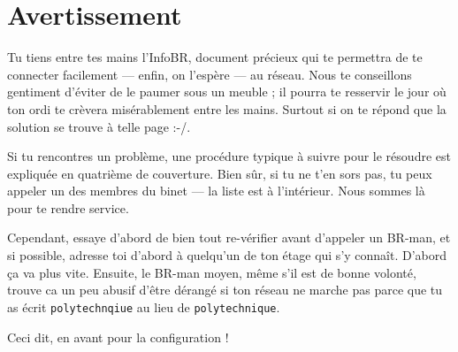\thispagestyle{empty}


\section*{Avertissement}

Tu tiens entre tes mains l'InfoBR, document pr\'ecieux qui te permettra de te connecter facilement
--- enfin, on l'esp\`ere --- au r\'eseau.
Nous te conseillons gentiment d'\'eviter de le paumer sous un meuble ; il pourra te resservir le jour o\`u ton ordi te cr\`evera mis\'erablement entre les
mains. Surtout si on te r\'epond que la solution se trouve \`a telle page :-/.

Si tu rencontres un probl\`eme, une proc\'edure typique \`a suivre pour le r\'esoudre est expliqu\'ee en quatri\`eme de couverture.
Bien sûr, si tu ne t'en sors pas, tu peux appeler un des membres du binet --- la liste est \`a l'int\'erieur.
Nous sommes l\`a pour te rendre service.

Cependant, essaye d'abord de bien tout re-v\'erifier avant d'appeler un BR-man, et si possible, adresse toi d'abord \`a quelqu'un de ton \'etage qui s'y
connaît. D'abord \c{c}a va plus vite. Ensuite, le BR-man moyen, m\^eme s'il est de bonne volont\'e, trouve ca un peu abusif d'\^etre d\'erang\'e si ton r\'eseau ne
marche pas parce que tu as \'ecrit \texttt{polytechnqiue} au lieu de \texttt{polytechnique}.

Ceci dit, en avant pour la configuration !

